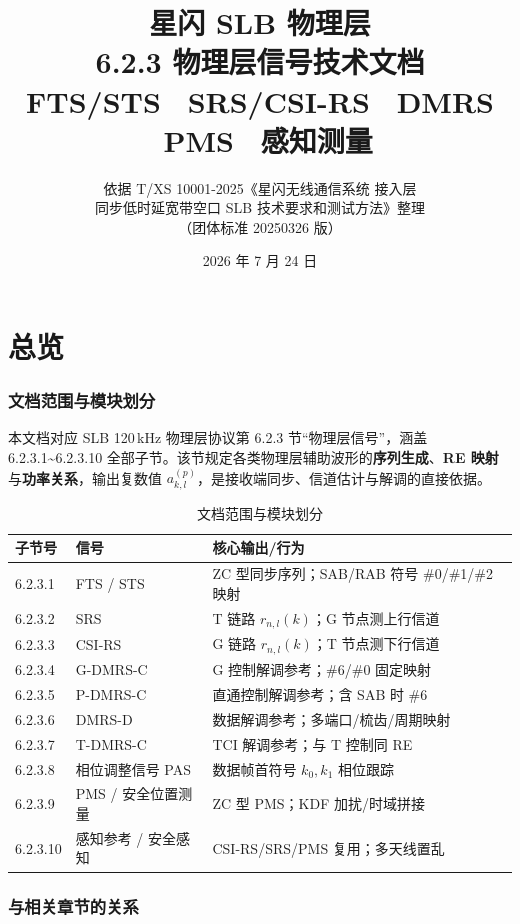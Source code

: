 \documentclass[11pt,a4paper]{ctexart}
\title{%
  \textbf{星闪 SLB 物理层}\\[0.4em]
  \Large 6.2.3 物理层信号技术文档\\[0.3em]
  \large FTS/STS \textbullet\ SRS/CSI-RS \textbullet\ DMRS \textbullet\ PMS \textbullet\ 感知测量
}
\author{依据 T/XS 10001-2025《星闪无线通信系统 接入层\\
同步低时延宽带空口 SLB 技术要求和测试方法》整理\\
（团体标准 20250326 版）}
\date{2026 年 7 月 24 日}
\begin{document}
\maketitle
\tableofcontents
\newpage

\part{总览}

\section{文档范围与模块划分}

本文档对应 SLB 120\,kHz 物理层协议第 6.2.3 节``物理层信号''，涵盖 6.2.3.1\textasciitilde 6.2.3.10 全部子节。该节规定各类物理层辅助波形的\textbf{序列生成}、\textbf{RE 映射}与\textbf{功率关系}，输出复数值 $a_{k,l}^{(p)}$，是接收端同步、信道估计与解调的直接依据。

\begin{longtable}{L{2.2cm}L{4.2cm}L{6.1cm}}
\caption{文档范围与模块划分} \\
\toprule
\textbf{子节号} & \textbf{信号} & \textbf{核心输出/行为} \\
.3.1 & FTS / STS & ZC 型同步序列；SAB/RAB 符号 \#0/\#1/\#2 映射 \\
6.2.3.2 & SRS & T 链路 $r_{n,l}(k)$；G 节点测上行信道 \\
6.2.3.3 & CSI-RS & G 链路 $r_{n,l}(k)$；T 节点测下行信道 \\
6.2.3.4 & G-DMRS-C & G 控制解调参考；\#6/\#0 固定映射 \\
6.2.3.5 & P-DMRS-C & 直通控制解调参考；含 SAB 时 \#6 \\
6.2.3.6 & DMRS-D & 数据解调参考；多端口/梳齿/周期映射 \\
6.2.3.7 & T-DMRS-C & TCI 解调参考；与 T 控制同 RE \\
6.2.3.8 & 相位调整信号 PAS & 数据帧首符号 $k_0,k_1$ 相位跟踪 \\
6.2.3.9 & PMS / 安全位置测量 & ZC 型 PMS；KDF 加扰/时域拼接 \\
6.2.3.10 & 感知参考 / 安全感知 & CSI-RS/SRS/PMS 复用；多天线置乱 \\
\bottomrule
\end{longtable}

\section{与相关章节的关系}
\end{document}
